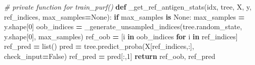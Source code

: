 \documentclass[
  11pt,
  oneside]{book}
\newenvironment{Shaded}{\begin{snugshade}}{\end{snugshade}}
\newcommand{\BuiltInTok}[1]{#1}
\newcommand{\CommentTok}[1]{\textcolor[rgb]{0.56,0.35,0.01}{\textit{#1}}}
\newcommand{\ControlFlowTok}[1]{\textcolor[rgb]{0.13,0.29,0.53}{\textbf{#1}}}
\newcommand{\DecValTok}[1]{\textcolor[rgb]{0.00,0.00,0.81}{#1}}
\newcommand{\KeywordTok}[1]{\textcolor[rgb]{0.13,0.29,0.53}{\textbf{#1}}}
\newcommand{\NormalTok}[1]{#1}
\newcommand{\OperatorTok}[1]{\textcolor[rgb]{0.81,0.36,0.00}{\textbf{#1}}}
\newcommand{\VariableTok}[1]{\textcolor[rgb]{0.00,0.00,0.00}{#1}}
\begin{document}
\begin{Shaded}
\begin{Highlighting}[]
\CommentTok{\# private function for train\_purf()}
\KeywordTok{def}\NormalTok{ \_get\_ref\_antigen\_stats(idx, tree, X, y, ref\_indices, max\_samples}\OperatorTok{=}\VariableTok{None}\NormalTok{):}
    \ControlFlowTok{if}\NormalTok{ max\_samples }\KeywordTok{is} \VariableTok{None}\NormalTok{:}
\NormalTok{        max\_samples }\OperatorTok{=}\NormalTok{ y.shape[}\DecValTok{0}\NormalTok{]}
\NormalTok{    oob\_indices }\OperatorTok{=}\NormalTok{ \_generate\_unsampled\_indices(tree.random\_state, y.shape[}\DecValTok{0}\NormalTok{], max\_samples)}
\NormalTok{    ref\_oob }\OperatorTok{=}\NormalTok{ [i }\KeywordTok{in}\NormalTok{ oob\_indices }\ControlFlowTok{for}\NormalTok{ i }\KeywordTok{in}\NormalTok{ ref\_indices]}
\NormalTok{    ref\_pred }\OperatorTok{=} \BuiltInTok{list}\NormalTok{()}
\NormalTok{    pred }\OperatorTok{=}\NormalTok{ tree.predict\_proba(X[ref\_indices,:], check\_input}\OperatorTok{=}\VariableTok{False}\NormalTok{)}
\NormalTok{    ref\_pred }\OperatorTok{=}\NormalTok{ pred[:,}\DecValTok{1}\NormalTok{]}
    \ControlFlowTok{return}\NormalTok{ ref\_oob, ref\_pred}
  

\end{Highlighting}
\end{Shaded}
\end{document}
